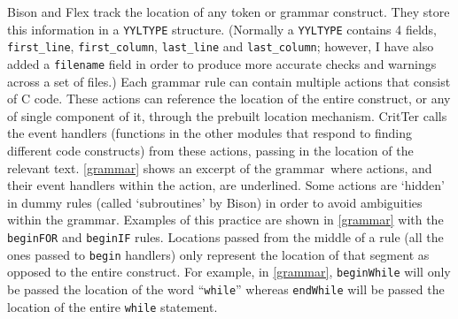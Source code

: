 \documentclass[12pt]{report}
\newcommand{\programName}{CritTer\xspace}
\begin{document}
Bison and Flex track the location of any token or grammar construct. They store this information in a 
\lstinline{YYLTYPE} structure. (Normally a \lstinline{YYLTYPE} contains 4 fields, \lstinline{first_line}, 
\lstinline{first_column}, \lstinline{last_line} and \lstinline{last_column}; however, I have also added a 
\lstinline{filename} field in order to produce more accurate checks and warnings across a set of 
files.) Each grammar rule can contain multiple actions that consist of C code. These actions can 
reference the location of the entire construct, or any of single component of it, through the prebuilt 
location mechanism. \programName calls the event handlers (functions in the other modules that 
respond to finding different code constructs) from these actions, passing in the location of the relevant 
text.  \autoref{grammar} shows an excerpt of the grammar\ where actions, and their event handlers within 
the action, are underlined. Some actions are `hidden' in dummy rules (called `subroutines' by Bison) in 
order to avoid ambiguities within the grammar. Examples of this practice are shown in \autoref{grammar} 
with the \lstinline{beginFOR} and \lstinline{beginIF} rules. Locations passed from the middle of a rule (all 
the ones passed to \lstinline{begin} handlers) only represent the location of that segment as opposed to 
the entire construct. For example, in \autoref{grammar}, \lstinline{beginWhile} will only be passed the 
location of the word ``\lstinline{while}'' whereas \lstinline{endWhile} will be passed the location of the 
entire \lstinline{while} statement.
\end{document}
